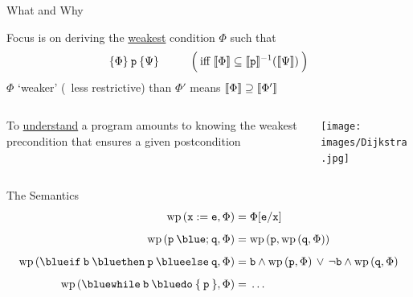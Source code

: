 \documentclass{beamer}
\begin{document}
\begin{frame}{What and Why}

        Focus is on deriving the \alert{\underline{weakest}} condition $\Phi$ such that
        \[
                \{ \Phi \} \> \mathtt{p} \> \{ \Psi \}   \hspace{1cm}
                \Big ( \> \text{iff } \llbracket \Phi \rrbracket \subseteq \llbracket \mathtt{p} \rrbracket^{-1}(\llbracket \Psi \rrbracket) \> \Big )
        \]
        \pause
        $\Phi$ `weaker' (\ie\ less restrictive) than $\Phi'$ means $\llbracket \Phi \rrbracket \supseteq \llbracket \Phi' \rrbracket$

        \pause
        \bigskip
        \bigskip
        \begin{minipage}[0.3\textheight]{\textwidth}
                \begin{columns}[c]
                \begin{column}{0.7\textwidth}
                        To \alert{\underline{understand}} a program amounts to knowing the weakest
                        precondition that ensures a given postcondition
                \end{column}
                \begin{column}{0.22\textwidth}
                        \texttt{[image: images/Dijkstra.jpg]}
                \end{column}
                \end{columns}
       \end{minipage}
\end{frame}

\begin{frame}{The Semantics}
        \begin{align*}
                \mathrm{wp}\,(\prog{x : = e}, \Phi) & = \Phi[\prog{e}/\prog{x}] \\[5pt]
                \mathrm{wp}\,(\prog{p} \> {\blue ;} \> \prog{q}, \Phi) & 
                = \mathrm{wp} \, (\prog{p}, \mathrm{wp} \, (\prog{q}, \Phi))  \\[5pt]
                \mathrm{wp}\,({\mathtt{{\blue if} \> b \> {\blue then} \> p \> {\blue else} \> q}}, \Phi)
                & 
                =
                \prog{b} \wedge \mathrm{wp}\, (\prog{p},\Phi) \, \vee \,
                \prog{\neg b} \wedge \mathrm{wp} \, (\prog{q}, \Phi)
                \\[5pt]
                \mathrm{wp} \, ({\mathtt{{\blue while} \> b \> {\blue do} \> \{ \> p \> \}} }, \Phi)
                & = \, \dots 
        \end{align*}
\end{frame}
\end{document}
